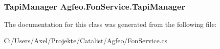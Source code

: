 \subsubsection[{\texorpdfstring{Tapi\+Manager}{TapiManager}}]{\setlength{\rightskip}{0pt plus 5cm}Tapi\+Manager Agfeo.\+Fon\+Service.\+Tapi\+Manager\hspace{0.3cm}{\ttfamily [get]}}\hypertarget{class_agfeo_1_1_fon_service_a67a3f32200a266732ce8d3e16e66df96}{}\label{class_agfeo_1_1_fon_service_a67a3f32200a266732ce8d3e16e66df96}






The documentation for this class was generated from the following file\+:\begin{DoxyCompactItemize}
\item 
C\+:/\+Users/\+Axel/\+Projekte/\+Catalist/\+Agfeo/Fon\+Service.\+cs\end{DoxyCompactItemize}
